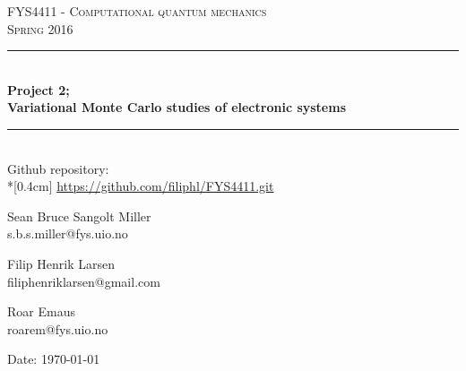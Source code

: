 \documentclass[english, a4paper]{article}
\begin{document}
	\renewcommand{\figurename}{Figure}
	\begin{titlepage}
		\begin{center}
			
			\textsc{\Large FYS4411 - Computational quantum mechanics }\\[0.5cm]
			\textsc{\Large Spring 2016}\\[1.5cm]
			\rule{\linewidth}{0.5mm} \\[0.4cm]
			{ \huge \bfseries  Project 2;\\ Variational Monte Carlo studies of electronic systems}\\[0.10cm]
			\rule{\linewidth}{0.5mm} \\[1.5cm]
			
			{\Large Github repository:} \\*[0.4cm]
			\url{https://github.com/filiphl/FYS4411.git}
			
			\vspace{13.5cm}
			
			
			\begin{minipage}{\textwidth}
				\begin{minipage}{0.333\textwidth}
					\begin{center} \large
						Sean Bruce Sangolt Miller\\
						{\footnotesize s.b.s.miller@fys.uio.no}
					\end{center}
				\end{minipage}
				\quad
				\begin{minipage}{0.333\textwidth}
					\begin{center} \large
						Filip Henrik Larsen\\
						{\footnotesize filiphenriklarsen@gmail.com}
					\end{center}
				\end{minipage}
				\quad
				\begin{minipage}{0.333\textwidth}
					\begin{center} \large
						Roar Emaus\\
						{\footnotesize 
						roarem@fys.uio.no}
					\end{center}
				\end{minipage}
			\end{minipage}
		
			\vfill
			
			\large{Date: \today}
			
		\end{center}
	\end{titlepage}
	
\end{document}
